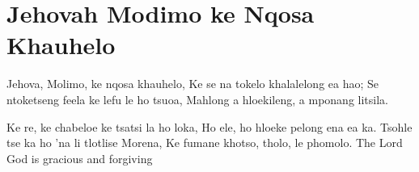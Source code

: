\starttocol
\chapter{Jehovah Modimo ke Nqosa Khauhelo}
\nexttocol
\hfill{\it }
\stoptocol
\starttocol
\startlines
{\sc Jehova}, Molimo, ke nqosa khauhelo,
Ke se na tokelo khalalelong ea hao;
Se ntoketseng feela ke lefu le ho tsuoa,
Mahlong a hloekileng, a mponang litsila.

Ke re, ke chabeloe ke tsatsi la ho loka,
Ho ele, ho hloeke pelong ena ea ka.
Tsohle tse ka ho 'na li tlotlise Morena,
Ke fumane khotso, tholo, le phomolo.
\stoplines
\nexttocol
The Lord God is gracious and forgiving
\stoptocol
